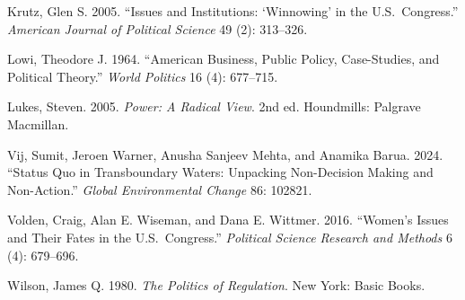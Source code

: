 \documentclass[11pt]{article}
\begin{document}
\begin{description}
\item Krutz, Glen S. 2005. ``Issues and Institutions: `Winnowing' in the U.S.\ Congress.'' \textit{American Journal of Political Science} 49 (2): 313--326.

\item Lowi, Theodore J. 1964. ``American Business, Public Policy, Case-Studies, and Political Theory.'' \textit{World Politics} 16 (4): 677--715.

\item Lukes, Steven. 2005. \textit{Power: A Radical View}. 2nd ed. Houndmills: Palgrave Macmillan.

\item Vij, Sumit, Jeroen Warner, Anusha Sanjeev Mehta, and Anamika Barua. 2024. ``Status Quo in Transboundary Waters: Unpacking Non-Decision Making and Non-Action.'' \textit{Global Environmental Change} 86: 102821.

\item Volden, Craig, Alan E. Wiseman, and Dana E. Wittmer. 2016. ``Women's Issues and Their Fates in the U.S.\ Congress.'' \textit{Political Science Research and Methods} 6 (4): 679--696.

\item Wilson, James Q. 1980. \textit{The Politics of Regulation}. New York: Basic Books.

\end{description}
\end{document}
